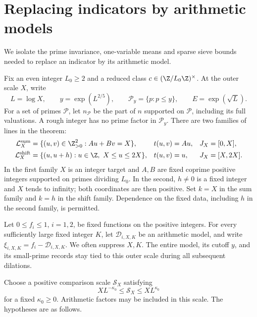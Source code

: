 \section{Replacing indicators by arithmetic models}\label{sec:comparison}

We isolate the prime invariance, one-variable means and sparse sieve
bounds needed to replace an indicator by its arithmetic model.

Fix an even integer \(L_0\ge2\) and a reduced class
\(c\in(\Z/L_0\Z)^\times\). At the outer scale \(X\), write
\[
 L=\log X,\qquad y=\exp(L^{2/5}),\qquad
 \mathcal P_y=\{p:p\le y\},\qquad E=\exp(\sqrt L).
\]
For a set of primes \(\mathcal P\), let \(n_{\mathcal P}\) be the
part of \(n\) supported on \(\mathcal P\), including its full
valuations. A rough integer has no prime factor in \(\mathcal P_y\).
There are two families of lines in the theorem:
\begin{align*}
 \mathcal L_X^{\rm sum}&=\{(u,v)\in\Z_{>0}^2:Au+Bv=X\},
       &t(u,v)&=Au, &J_X&=[0,X],\\
 \mathcal L_X^{\rm shift}&=\{(u,u+h):u\in\Z,\ X\le u\le2X\},
       &t(u,v)&=u, &J_X&=[X,2X].
\end{align*}
In the first family \(X\) is an integer target and \(A,B\) are
fixed coprime positive integers supported on primes dividing \(L_0\).
In the second, \(h\ne0\) is a fixed integer and \(X\) tends to
infinity; both coordinates are then positive. Set \(k=X\) in the
sum family and \(k=h\) in the shift family. Dependence on the
fixed data, including \(h\) in the second family, is permitted.

Let \(0\le f_i\le1\), \(i=1,2\), be fixed functions on the
positive integers. For every sufficiently large fixed integer \(K\),
let \(\mathcal D_{i,X,K}\) be an arithmetic model, and write
\(\xi_{i,X,K}=f_i-\mathcal D_{i,X,K}\). We often suppress \(X,K\).
The entire model, its cutoff \(y\), and its small-prime records stay
tied to this outer scale during all subsequent dilations.

Choose a positive comparison scale \(\mathcal S_X\) satisfying
\begin{equation}\label{eq:comparison-scale}
        XL^{-\kappa_0}\le\mathcal S_X\le XL^{\kappa_0}
\end{equation}
for a fixed \(\kappa_0\ge0\). Arithmetic factors may be included
in this scale. The hypotheses are as follows.

